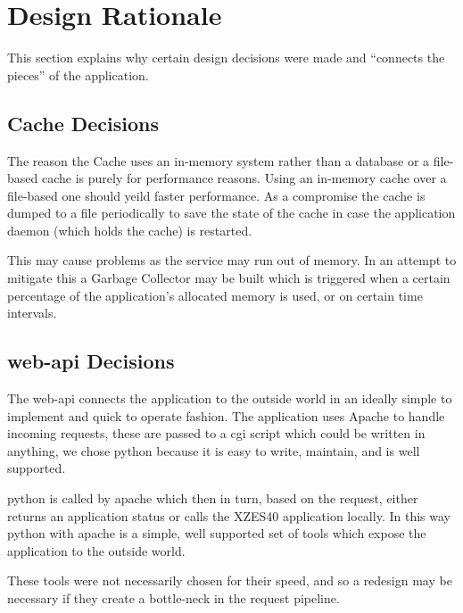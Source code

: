 \section{Design Rationale}

This section explains why certain design decisions were made and ``connects the pieces'' of the application.

\subsection{Cache Decisions}

The reason the Cache uses an in-memory system rather than a database or a file-based cache is purely for performance reasons.
Using an in-memory cache over a file-based one should yeild faster performance.
As a compromise the cache is dumped to a file periodically to save the state of the cache in case the application daemon (which holds the cache) is restarted.

This may cause problems as the service may run out of memory.
In an attempt to mitigate this a Garbage Collector may be built which is triggered when a certain percentage of the application's allocated memory is used, or on certain time intervals.
 
\subsection{\gls{web-api} Decisions}

The \gls{web-api} connects the application to the outside world in an ideally simple to implement and quick to operate fashion.
The application uses Apache to handle incoming requests, these are passed to a \gls{cgi} script which could be written in anything, we chose \gls{python} because it is easy to write, maintain, and is well supported.

\gls{python} is called by \gls{apache} which then in turn, based on the request, either returns an application status or calls the XZES40 application locally.
In this way \gls{python} with \gls{apache} is a simple, well supported set of tools which expose the application to the outside world.

These tools were not necessarily chosen for their speed, and so a redesign may be necessary if they create a bottle-neck in the request pipeline.

